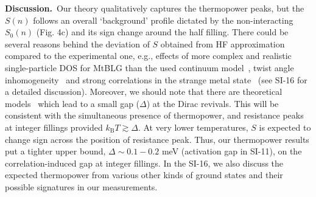 \documentclass{nature}
\begin{document}
\noindent\textbf{Discussion.}\ 
Our theory qualitatively captures the thermopower peaks, but the $S(n)$ follows an overall `background' profile dictated by the non-interacting $S_0(n)$ (Fig. 4c) and its sign change around the half filling. There could be several reasons behind the deviation of $S$ obtained from HF approximation compared to the experimental one, e.g., effects of more complex and realistic single-particle DOS for MtBLG than the used continuum model~\cite{zondiner2020cascade,Bistritzer12233,PhysRevX.8.031087}, twist angle inhomogeneity~\cite{zondiner2020cascade,uri_mapping_2020} and strong correlations in the strange metal state~\cite{PhysRevLett.124.076801} (see SI-16 for a detailed discussion). Moreover, we should note that there are theoretical models~\cite{PhysRevX.8.031089,PhysRevX.10.031034,shavit2021theory} which lead to a small gap ($\Delta$) at the Dirac revivals. This will be consistent with the simultaneous presence of thermopower, and resistance peaks at integer fillings provided $k_\mathrm{B}T\gtrsim \Delta$. At very lower temperatures, $S$ is expected to change sign across the position of resistance peak. Thus, our thermopower results put a tighter upper bound, $\Delta \sim 0.1-0.2$ meV (activation gap in SI-11), on the correlation-induced gap at integer fillings. In the SI-16, we also discuss the expected thermopower from various other kinds of ground states %
and their possible signatures in our measurements.

\end{document}
